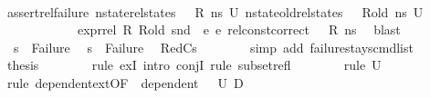 \begin{isabellebody}
\ \ \ \ \ \ \isamarkupfalse%
\ assert{\isacharunderscore}{\kern0pt}rel{\isacharunderscore}{\kern0pt}failure\ {\isacartoucheopen}nstate{\isacharunderscore}{\kern0pt}rel{\isacharunderscore}{\kern0pt}states\ {\isasymLambda}\ {\isasymLambda}{\isacharprime}{\kern0pt}\ R\ ns\ U{}{\isacartoucheclose}\ {\isacartoucheopen}nstate{\isacharunderscore}{\kern0pt}old{\isacharunderscore}{\kern0pt}rel{\isacharunderscore}{\kern0pt}states\ {\isasymLambda}\ {\isasymLambda}{\isacharprime}{\kern0pt}\ R{\isacharunderscore}{\kern0pt}old\ ns\ U{}{\isacartoucheclose}\isanewline
\ \ \ \ \ \ \ \ \ \ \ \ {\isacartoucheopen}expr{\isacharunderscore}{\kern0pt}rel\ R\ R{\isacharunderscore}{\kern0pt}old\ {\isacharparenleft}{\kern0pt}snd\ {\isasymLambda}{\isacharparenright}{\kern0pt}\ e{}\ e{}{\isacartoucheclose}\ {\isacartoucheopen}rel{\isacharunderscore}{\kern0pt}const{\isacharunderscore}{\kern0pt}correct\ {\isasymLambda}\ {\isasymOmega}\ R\ ns{\isacartoucheclose}\ \isamarkupfalse%
\ blast\isanewline
\ \ \ \ \isamarkupfalse%
\ \ {\isacartoucheopen}s{\isacharprime}{\kern0pt}{\isacharprime}{\kern0pt}\ {\isacharequal}{\kern0pt}\ Failure{\isacartoucheclose}\ \isamarkupfalse%
\ {\isachardoublequoteopen}s{\isacharprime}{\kern0pt}\ {\isacharequal}{\kern0pt}\ Failure{\isachardoublequoteclose}\ \isamarkupfalse%
\ RedCs{}\isanewline
\ \ \ \ \ \ \isamarkupfalse%
\ {\isacharparenleft}{\kern0pt}simp\ add{\isacharcolon}{\kern0pt}\ failure{\isacharunderscore}{\kern0pt}stays{\isacharunderscore}{\kern0pt}cmd{\isacharunderscore}{\kern0pt}list{\isacharparenright}{\kern0pt}\isanewline
\ \ \ \ \isamarkupfalse%
\ {\isacharquery}{\kern0pt}thesis\isanewline
\ \ \ \ \ \ \isamarkupfalse%
\ {\isacharparenleft}{\kern0pt}rule\ exI{\isacharcomma}{\kern0pt}\ intro\ conjI{\isacharcomma}{\kern0pt}\ rule\ subset{\isacharunderscore}{\kern0pt}refl{\isacharparenright}{\kern0pt}\isanewline
\ \ \ \ \ \ \isamarkupfalse%
\ {\isacharparenleft}{\kern0pt}rule\ {\isacartoucheopen}U{}\ {\isasymnoteq}\ {\isacharbraceleft}{\kern0pt}{\isacharbraceright}{\kern0pt}{\isacartoucheclose}{\isacharparenright}{\kern0pt}\isanewline
\ \ \ \ \ \ \ \isamarkupfalse%
\ {\isacharparenleft}{\kern0pt}rule\ dependent{\isacharunderscore}{\kern0pt}ext{\isacharbrackleft}{\kern0pt}OF\ {\isacharunderscore}{\kern0pt}\ {\isacartoucheopen}dependent\ {\isasymLambda}{\isacharprime}{\kern0pt}\ {\isasymOmega}\ U{}\ D{}{\isacartoucheclose}{\isacharbrackright}{\kern0pt}{\isacharparenright}{\kern0pt}\isanewline

\end{isabellebody}
